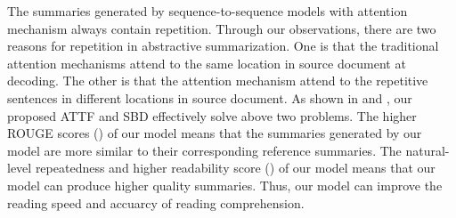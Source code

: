 The summaries generated by sequence-to-sequence models with attention mechanism always contain repetition.  
Through our observations, there are two reasons for repetition in abstractive summarization.
One is that the traditional attention mechanisms attend to the same location in source document at decoding.
The other is that the attention mechanism attend to the repetitive sentences in different locations in source document. 
As shown in  and ,
our proposed ATTF and SBD effectively solve above two problems.  
The higher ROUGE scores () of our model means that
the summaries generated by our model are more similar to their corresponding reference summaries.
The natural-level repeatedness and higher readability score () of our model means 
that our model can produce higher quality summaries.
Thus, our model can improve the reading speed and accuarcy of reading comprehension.



